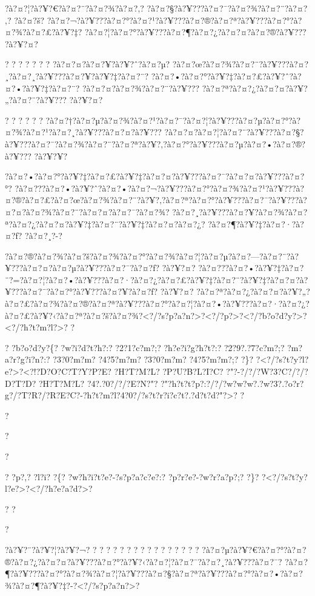 \documentclass[11pt, openany]{book}
\begin{document}
{{{{{{{{{{?à?¤?¦?à?¥?€?à?¤?¨?à?¤?¾?à?¤?‚? ?à?¤?§?à?¥???à?¤?¯?à?¤?¾?à?¤?¨?à?¤?‚?
?à?¤?š?
?à?¤?¬?à?¥???à?¤?°?à?¤?¹?à?¥???à?¤?®?à?¤?ª?à?¥???à?¤?°?à?¤?¾?à?¤?£?à?¥?‡?
?à?¤?¦?à?¤?°?à?¥???à?¤?¶?à?¤?¿?à?¤?¤?à?¤?®?à?¥??? ?à?¥?¤?

? ? ? ? ? ? ? ?à?¤?¤?à?¤?¥?à?¥?ˆ?à?¤?µ?
?à?¤?œ?à?¤?¾?à?¤?¨?à?¥???à?¤?¸?à?¤?¸?à?¥???à?¤?¥?à?¥?‡?à?¤?¨?
?à?¤?•?à?¤?°?à?¥?‡?à?¤?£?à?¥?ˆ?à?¤?•?à?¥?‡?à?¤?¨?
?à?¤?¤?à?¤?¾?à?¤?¨?à?¥??? ?à?¤?ª?à?¤?¿?à?¤?¤?à?¥?„?à?¤?¨?à?¥??? ?à?¥?¤?

? ? ? ? ? ?
?à?¤?†?à?¤?µ?à?¤?¾?à?¤?¹?à?¤?¯?à?¤?¦?à?¥???à?¤?µ?à?¤?°?à?¤?¾?à?¤?¹?à?¤?¸?à?¥???à?¤?¤?à?¥???
?à?¤?¤?à?¤?¦?à?¤?¨?à?¥???à?¤?§?à?¥???à?¤?¯?à?¤?¾?à?¤?¨?à?¤?ª?à?¥?‚?à?¤?°?à?¥???à?¤?µ?à?¤?•?à?¤?®?à?¥???
?à?¥?¥?

?à?¤?•?à?¤?°?à?¥?‡?à?¤?£?à?¥?‡?à?¤?¤?à?¥???à?¤?¯?à?¤?¤?à?¥???à?¤?°?
?à?¤???à?¤?•?à?¥?ˆ?à?¤?•?à?¤?¬?à?¥???à?¤?°?à?¤?¾?à?¤?¹?à?¥???à?¤?®?à?¤?£?à?¤?œ?à?¤?¾?à?¤?¨?à?¥?‚?à?¤?ª?à?¤?°?à?¥???à?¤?¯?à?¥???à?¤?¤?à?¤?¾?à?¤?¨?à?¤?¤?à?¤?¯?à?¤?¾?
?à?¤?¸?à?¥???à?¤?¥?à?¤?¾?à?¤?ª?à?¤?¿?à?¤?¤?à?¥?‡?à?¤?¨?à?¥?‡?à?¤?¤?à?¤?¿?
?à?¤?¶?à?¥?‡?à?¤?·?à?¤?ƒ? ?à?¤?¸?-?

?à?¤?®?à?¤?¾?à?¤?š?à?¤?¾?à?¤?°?à?¤?¾?à?¤?¦?à?¤?µ?à?¤?---?à?¤?¨?à?¥???à?¤?¤?à?¤?µ?à?¥???à?¤?¯?à?¤?ƒ?
?à?¥?¤?
?à?¤???à?¤?•?à?¥?‡?à?¤?¨?=?à?¤?¦?à?¤?•?à?¥???à?¤?·?à?¤?¿?à?¤?£?à?¥?‡?à?¤?¨?à?¥?‡?à?¤?¤?à?¥???à?¤?¯?à?¤?°?à?¥???à?¤?¥?à?¤?ƒ?
?à?¥?¤?
?à?¤?ª?à?¤?¿?à?¤?¤?à?¥?„?à?¤?£?à?¤?¾?à?¤?®?à?¤?ª?à?¥???à?¤?°?à?¤?¦?à?¤?•?à?¥???à?¤?·?à?¤?¿?à?¤?£?à?¥?‹?à?¤?ª?à?¤?š?à?¤?¾?\textless{}?/?s?p?a?n?\textgreater{}?\textless{}?/?p?\textgreater{}?\textless{}?/?b?o?d?y?\textgreater{}?\textless{}?/?h?t?m?l?\textgreater{}?
?

? ?b?o?d?y?\{? ?w?i?d?t?h?:? ?2?1?c?m?;? ?h?e?i?g?h?t?:? ?2?9?.?7?c?m?;?
?m?a?r?g?i?n?:? ?3?0?m?m? ?4?5?m?m? ?3?0?m?m? ?4?5?m?m?;? ?\}?
?\textless{}?/?s?t?y?l?e?\textgreater{}?\textless{}?!?D?O?C?T?Y?P?E?
?H?T?M?L? ?P?U?B?L?I?C? ?"?-?/?/?W?3?C?/?/?D?T?D? ?H?T?M?L?
?4?.?0?/?/?E?N?"?
?"?h?t?t?p?:?/?/?w?w?w?.?w?3?.?o?r?g?/?T?R?/?R?E?C?-?h?t?m?l?4?0?/?s?t?r?i?c?t?.?d?t?d?"?\textgreater{}?
?

?

?

?

? ?p?,? ?l?i? ?\{? ?w?h?i?t?e?-?s?p?a?c?e?:? ?p?r?e?-?w?r?a?p?;? ?\}?
?\textless{}?/?s?t?y?l?e?\textgreater{}?\textless{}?/?h?e?a?d?\textgreater{}?

? ?

?

?à?¥?¨?à?¥?¦?à?¥?¬? ? ? ? ? ? ? ? ? ? ? ? ? ? ? ? ?
?à?¤?µ?à?¥?€?à?¤?°?à?¤?®?à?¤?¿?à?¤?¤?à?¥???à?¤?°?à?¥?‹?à?¤?¦?à?¤?¯?à?¤?¸?à?¥???à?¤?¯?
?à?¤?¶?à?¥???à?¤?°?à?¤?¾?à?¤?¦?à?¥???à?¤?§?à?¤?ª?à?¥???à?¤?°?à?¤?•?à?¤?¾?à?¤?¶?à?¥?‡?-?\textless{}?/?s?p?a?n?\textgreater{}?

}}}}}}}}}}
\end{document}
